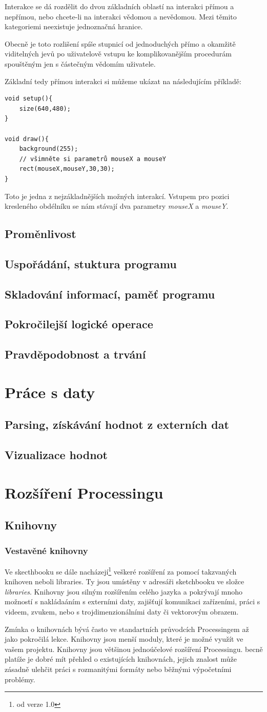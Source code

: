 \documentclass[12pt,twopage]{book}
\newcommand{\oddil}[1]{\section{#1}\label{sec:#1}}
\newcommand{\pododdil}[1]{\subsection{#1}\label{subsec:#1}}
\newcommand{\vyraz}[1]{\textit{\gls{#1}}\index{#1}}
\begin{document}
Interakce se dá rozdělit do dvou základních oblastí na interakci přímou a nepřímou, nebo chcete-li na interakci vědomou a nevědomou. Mezi těmito kategoriemi neexistuje jednoznačná hranice.

Obecně je toto rozlišení spíše stupnicí od jednoduchých přímo a okamžitě viditelných jevů po uživatelově vstupu ke komplikovanějším procedurám spouštěným jen s částečným vědomím uživatele.

Základní tedy přímou interakci si můžeme ukázat na následujícím příkladě:

\begin{lstlisting}
void setup(){
	size(640,480);
}

void draw(){
	background(255);
	// všimněte si parametrů mouseX a mouseY
	rect(mouseX,mouseY,30,30);
}
\end{lstlisting}

Toto je jedna z nejzákladnějších možných interakcí. Vstupem pro pozici kresleného obdélníku se nám stávají dva parametry \vyraz{mouseX} a \vyraz{mouseY}.


\oddil{Proměnlivost}

\oddil{Uspořádání, stuktura programu}
\oddil{Skladování informací, paměť programu}
\oddil{Pokročilejší logické operace}

\oddil{Pravděpodobnost a trvání}

\chapter{Práce s daty}

\oddil{Parsing, získávání hodnot z externích dat}
\oddil{Vizualizace hodnot}


\chapter{Rozšíření Processingu}
\oddil{Knihovny}

\pododdil{Vestavěné knihovny}

Ve skecthbooku se dále nacházejí\footnote{od verze 1.0} veškeré rozšíření za pomocí takzvaných knihoven neboli libraries. Ty jsou umístěny v adresáři sketchbooku ve složce {\em libraries}. Knihovny jsou silným rozšířením celého jazyka a pokrývají mnoho možností s nakládaáním s externími daty, zajišťují komunikaci zařízeními, práci s videem, zvukem, nebo s trojdimenzionálními daty či vektorovým obrazem.

Zmínka o knihovnách bývá často ve standartních průvodcích Processingem až jako pokročilá lekce. Knihovny jsou menší moduly, které je možné využít ve vašem projektu. Knihovny jsou většinou jednoúčelové rozšíření Processingu. becně platíže je dobré mít přehled o existujících knihovnách, jejich znalost může zásadně ulehčit práci s rozmanitými formáty nebo běžnými výpočetními problémy.
\end{document}
